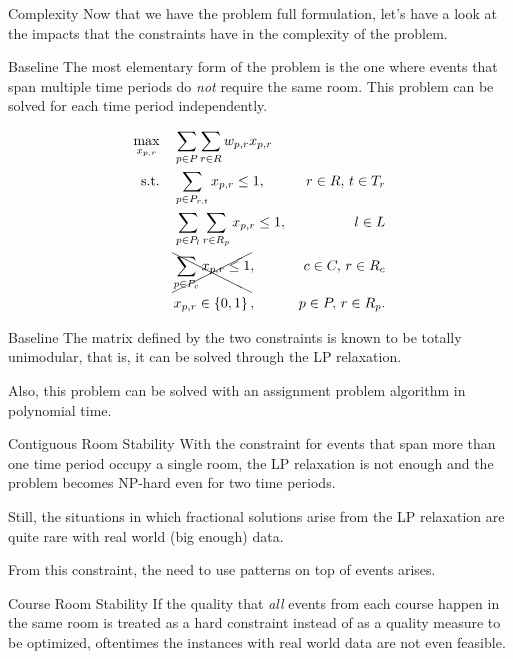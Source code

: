 \documentclass{beamer}
\begin{document}
\begin{frame}{Complexity}
    Now that we have the problem full formulation, let's have a look at the impacts that the constraints have in the complexity of the problem.
\end{frame}

\begin{frame}{Baseline}
    The most elementary form of the problem is the one where events that span multiple time periods do \emph{not} require the same room. This problem can be solved for each time period independently.

    \begin{align*}
        \max_{x_{p,r}} \quad & \sum_{p \in P} \sum_{r\in R} w_{p,r}x_{p,r} \\
	\textrm{s.t.} \quad & \sum_{p \in P_{r,t}} x_{p,r} \le 1, & r\in R,\,t\in T_r \\
			    & \sum_{p \in P_l} \sum_{r \in R_p} x_{p,r} \le 1, & l \in L \\
			    & \xcancel{\sum_{p \in P_c} x_{p,r} \le 1}, & c \in C,\, r \in R_c \\
			    & x_{p,r} \in \left\{ 0,1 \right\}, & p \in P,\, r\in R_p
    .\end{align*}
\end{frame}

\begin{frame}{Baseline}
    The matrix defined by the two constraints is known to be totally unimodular, that is, it can be solved through the LP relaxation. \linebreak

    Also, this problem can be solved with an assignment problem algorithm in polynomial time.
\end{frame}

\begin{frame}{Contiguous Room Stability}
    With the constraint for events that span more than one time period occupy a single room, the LP relaxation is not enough and the problem becomes NP-hard even for two time periods. \linebreak

    Still, the situations in which fractional solutions arise from the LP relaxation are quite rare with real world (big enough) data. \linebreak

    From this constraint, the need to use patterns on top of events arises.
\end{frame}

\begin{frame}{Course Room Stability}
    If the quality that \emph{all} events from each course happen in the same room is treated as a hard constraint instead of as a quality measure to be optimized, oftentimes the instances with real world data are not even feasible.
\end{frame}
\end{document}
